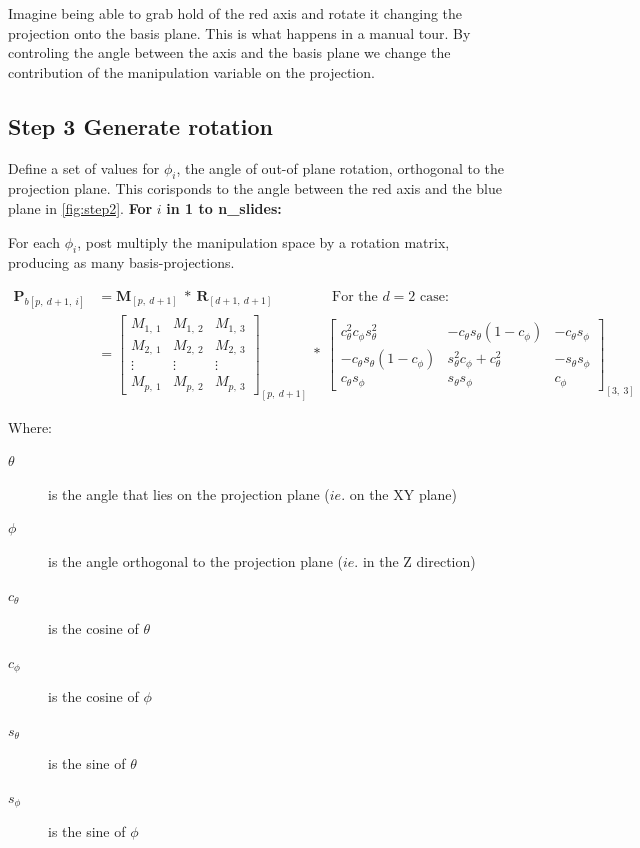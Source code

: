 \documentclass{monashthesis}
\begin{document}
Imagine being able to grab hold of the red axis and rotate it changing the projection onto the basis plane. This is what happens in a manual tour. By controling the angle between the axis and the basis plane we change the contribution of the manipulation variable on the projection.

\hypertarget{step-3-generate-rotation}{%
\subsection{Step 3 Generate rotation}\label{step-3-generate-rotation}}

Define a set of values for \(\phi_i\), the angle of out-of plane rotation, orthogonal to the projection plane. This corisponds to the angle between the red axis and the blue plane in \ref{fig:step2}.
\textbf{For } \(i\) \textbf{in 1 to n\_slides:}

For each \(\phi_i\), post multiply the manipulation space by a rotation matrix, producing as many basis-projections.

\begin{align*}
  \textbf{P}_{b[p,~d+1,~i]}
  &= \textbf{M}_{[p,~d+1]} ~*~ \textbf{R}_{[d+1,~d+1]} 
    ~~~~~~~~~~~~~~~~~~~\text{For the $d=2$ case:} \\
  &= \begin{bmatrix}
    M_{1,~1} & M_{1,~2} & M_{1,~3} \\
    M_{2,~1} & M_{2,~2} & M_{2,~3} \\
    \vdots   & \vdots   & \vdots   \\
    M_{p,~1} & M_{p,~2} & M_{p,~3}
  \end{bmatrix}_{[p,~d+1]}
    ~*~
  \begin{bmatrix}
    c_\theta^2 c_\phi s_\theta^2 &
    -c_\theta s_\theta (1 - c_\phi) &
    -c_\theta s_\phi \\
    -c_\theta s_\theta (1 - c_\phi) &
    s_\theta^2 c_\phi + c_\theta^2 &
    -s_\theta s_\phi \\
    c_\theta s_\phi &
    s_\theta s_\phi &
    c_\phi
  \end{bmatrix}_{[3,~3]}
\end{align*}

Where:

\begin{description}
  \item[$\theta$] is the angle that lies on the projection plane ($ie.$ on the XY plane)
  \item[$\phi$] is the angle orthogonal to the projection plane ($ie.$ in the Z direction)
  \item[$c_\theta$] is the cosine of $\theta$
  \item[$c_\phi$]   is the cosine of $\phi$
  \item[$s_\theta$] is the sine of   $\theta$
  \item[$s_\phi$]   is the sine of   $\phi$
\end{description}
\end{document}
